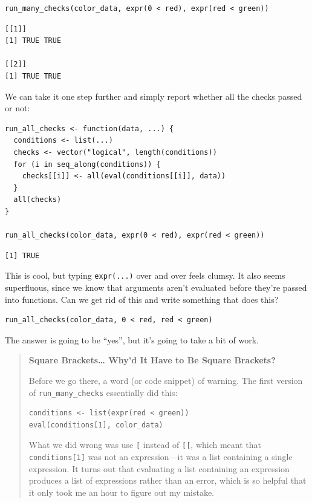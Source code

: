\begin{lstlisting}
run_many_checks(color_data, expr(0 < red), expr(red < green))
\end{lstlisting}

\begin{lstlisting}
[[1]]
[1] TRUE TRUE

[[2]]
[1] TRUE TRUE
\end{lstlisting}

We can take it one step further
and simply report whether all the checks passed or not:

\begin{lstlisting}
run_all_checks <- function(data, ...) {
  conditions <- list(...)
  checks <- vector("logical", length(conditions))
  for (i in seq_along(conditions)) {
    checks[[i]] <- all(eval(conditions[[i]], data))
  }
  all(checks)
}

run_all_checks(color_data, expr(0 < red), expr(red < green))
\end{lstlisting}

\begin{lstlisting}
[1] TRUE
\end{lstlisting}

This is cool,
but typing \texttt{expr(...)} over and over feels clumsy.
It also seems superfluous,
since we know that arguments aren't evaluated before they're passed into functions.
Can we get rid of this and write something that does this?

\begin{lstlisting}
run_all_checks(color_data, 0 < red, red < green)
\end{lstlisting}

\noindent
The answer is going to be ``yes'',
but it's going to take a bit of work.

\begin{quote}
\textbf{Square Brackets{\ldots} Why'd It Have to Be Square Brackets?}

Before we go there,
a word (or code snippet) of warning.
The first version of \texttt{run\_many\_checks} essentially did this:

\begin{lstlisting}
conditions <- list(expr(red < green))
eval(conditions[1], color_data)
\end{lstlisting}

\noindent
What we did wrong was use \texttt{[} instead of \texttt{[[},
which meant that \texttt{conditions[1]} was not an expression---it was a list containing a single expression.
It turns out that evaluating a list containing an expression produces a list of expressions rather than an error,
which is so helpful that it only took me an hour to figure out my mistake.
\end{quote}

